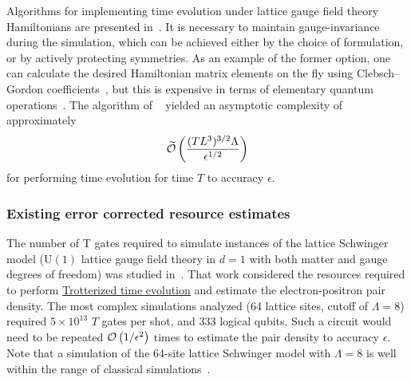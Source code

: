 \begin{refsection}
Algorithms for implementing time evolution under lattice gauge field theory Hamiltonians are presented in~\cite{tong2021ProvablyAccurateGaugeTheoryBosonicSystems,shaw2020QuantumAlgorithmsSchwinger,kan2021lattice,Rajput2022HybridizedMF}. It is necessary to maintain gauge-invariance during the simulation, which can be achieved either by the choice of formulation, or by actively protecting symmetries. As an example of the former option, one can calculate the desired Hamiltonian matrix elements on the fly using Clebsch--Gordon coefficients~\cite{byrnes2006LatticeGaugeTheory}, but this is expensive in terms of elementary quantum operations~\cite{kan2021lattice}. The algorithm of ~\cite{kan2021lattice} yielded an asymptotic complexity of approximately 
\begin{equation}\label{Eq:LGTscaling}
    \widetilde{\mathcal{O}}\left( \frac{(T L^3)^{3/2} \Lambda}{\epsilon^{1/2}} \right)
\end{equation}
for performing time evolution for time $T$ to accuracy $\epsilon$.



\subsubsection*{Existing error corrected resource estimates}
The number of T gates required to simulate instances of the lattice Schwinger model (U$(1)$ lattice gauge field theory in $d=1$ with both matter and gauge degrees of freedom) was studied in~\cite{shaw2020QuantumAlgorithmsSchwinger}. That work considered the resources required to perform \hyperref[prim:HamiltonianSimulation]{Trotterized time evolution} and estimate the electron-positron pair density. The most complex simulations analyzed (64 lattice sites, cutoff of $\Lambda=8$) required $5 \times 10^{13}$ $T$ gates per shot, and $333$ logical qubits. Such a circuit would need to be repeated $\mathcal{O}\left( 1/\epsilon^2 \right)$ times to estimate the pair density to accuracy $\epsilon$. Note that a simulation of the 64-site lattice Schwinger model with $\Lambda=8$ is well within the range of classical simulations~\cite{felser2020TensorNetworkLGT2D,magnifico2021TensorNetworkLGT3D}.


\end{refsection}
